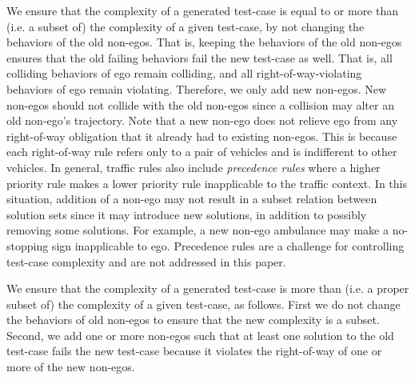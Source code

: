 We ensure that the complexity of a generated test-case is equal to or more than (i.e. a subset of) the complexity of a given test-case, by not changing the behaviors of the old non-egos.
%
That is, keeping the behaviors of the old non-egos ensures that the old failing behaviors fail the new test-case as well.
%
That is, all colliding behaviors of ego remain colliding, and all right-of-way-violating behaviors of ego remain violating.
%
Therefore, we only add new non-egos.
%
New non-egos should not collide with the old non-egos since a collision may alter an old non-ego's trajectory.
%
Note that a new non-ego does not relieve ego from any right-of-way obligation that it already had to existing non-egos.
%
This is because each right-of-way rule refers only to a pair of vehicles and is indifferent to other vehicles.
%
In general, traffic rules also include \emph{precedence rules} where a higher priority rule makes a lower priority rule inapplicable to the traffic context.
%
In this situation, addition of a non-ego may not result in a subset relation between solution sets since it may introduce new solutions, in addition to possibly removing some solutions.
%
For example, a new non-ego ambulance may make a no-stopping sign inapplicable to ego.
%
Precedence rules are a challenge for controlling test-case complexity and are not addressed in this paper.


We ensure that the complexity of a generated test-case is more than (i.e. a proper subset of) the complexity of a given test-case, as follows.
%
First we do not change the behaviors of old non-egos to ensure that the new complexity is a subset.
%
Second, we add one or more non-egos such that at least one solution to the old test-case fails the new test-case because it violates the right-of-way of one or more of the new non-egos.




